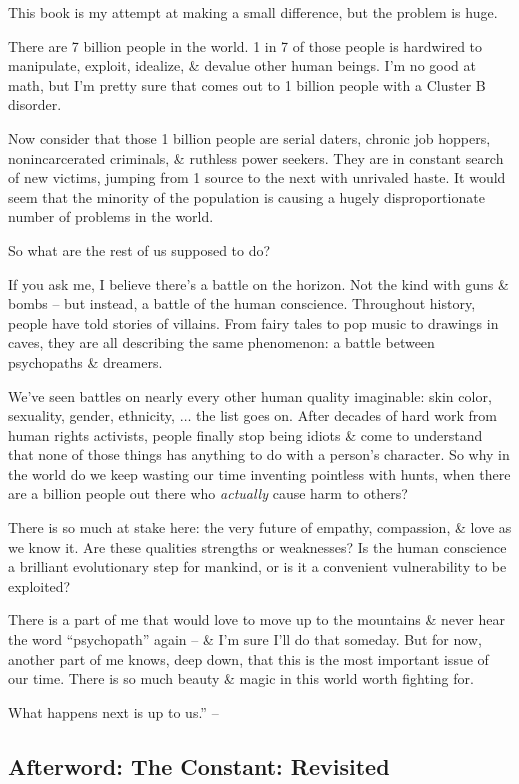 \documentclass{article}
\numberwithin{equation}{section}
\begin{document}
This book is my attempt at making a small difference, but the problem is huge.

There are 7 billion people in the world. 1 in 7 of those people is hardwired to manipulate, exploit, idealize, \& devalue other human beings. I'm no good at math, but I'm pretty sure that comes out to 1 billion people with a Cluster B disorder.

Now consider that those 1 billion people are serial daters, chronic job hoppers, nonincarcerated criminals, \& ruthless power seekers. They are in constant search of new victims, jumping from 1 source to the next with unrivaled haste. It would seem that the minority of the population is causing a hugely disproportionate number of problems in the world.

So what are the rest of us supposed to do?

If you ask me, I believe there's a battle on the horizon. Not the kind with guns \& bombs -- but instead, a battle of the human conscience. Throughout history, people have told stories of villains. From fairy tales to pop music to drawings in caves, they are all describing the same phenomenon: a battle between psychopaths \& dreamers.

We've seen battles on nearly every other human quality imaginable: skin color, sexuality, gender, ethnicity, $\ldots$ the list goes on. After decades of hard work from human rights activists, people finally stop being idiots \& come to understand that none of those things has anything to do with a person's character. So why in the world do we keep wasting our time inventing pointless with hunts, when there are a billion people out there who \textit{actually} cause harm to others?

There is so much at stake here: the very future of empathy, compassion, \& love as we know it. Are these qualities strengths or weaknesses? Is the human conscience a brilliant evolutionary step for mankind, or is it a convenient vulnerability to be exploited?

There is a part of me that would love to move up to the mountains \& never hear the word ``psychopath'' again -- \& I'm sure I'll do that someday. But for now, another part of me knows, deep down, that this is the most important issue of our time. There is so much beauty \& magic in this world worth fighting for.

What happens next is up to us.'' -- \cite[pp. 199--201]{MacKenzie2015}

\subsection{Afterword: The Constant: Revisited}
\end{document}
